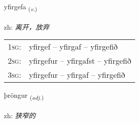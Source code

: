 \documentclass[frontgrid, backgrid]{flacards}\usepackage[]{graphicx}\usepackage[]{color}
\begin{document}
\renewcommand{\flhead}{\vskip5pt \fboxsep=0pt {\small\bfseries\footnotesize Sagnorð | 动词}}
\renewcommand{\fcfoot}{\vskip5pt \fboxsep=0pt \hspace{2pt}{\small\bfseries\footnotesize 2K}}

\renewcommand{\blhead}{\vskip5pt {\small\bfseries\footnotesize Sagnorð | 动词 }}
\renewcommand{\bcfoot}{\vskip5pt \hspace{2pt}{\small\bfseries\footnotesize 2K}}


{yfirgefa \small{\textsubscript{(\textit{v.})}} \\[1ex] %
\textphonetic{[ɪːvɪrcɛva]} \\
zh: \emph{离开，放弃} \\  [2ex]
\renewcommand*{\arraystretch}{0.8}
\begin{tabular}{p{1cm}l}
\textsc{1sg}: & yfirgef -- yfirgaf -- yfirgefið \\ 
\textsc{2sg}: & yfirgefur -- yfirgafst -- yfirgefið \\ 
\textsc{3sg}: & yfirgefur -- yfirgaf -- yfirgefið \\ 
\end{tabular}
}

\renewcommand{\flhead}{\vskip5pt \fboxsep=0pt {\small\bfseries\footnotesize Lýsingarorð | 形容词}}
\renewcommand{\fcfoot}{\vskip5pt \fboxsep=0pt \hspace{2pt}{\small\bfseries\footnotesize 2K}}

\renewcommand{\blhead}{\vskip5pt {\small\bfseries\footnotesize Lýsingarorð | 形容词 }}
\renewcommand{\bcfoot}{\vskip5pt \hspace{2pt}{\small\bfseries\footnotesize 2K}}


{þröngur \small{\textsubscript{(\textit{adj.})}} \\[1ex] %
\textphonetic{[θrœiŋkʏr]} \\
zh: \emph{狭窄的} \\  [2ex]
\renewcommand*{\arraystretch}{0.8}
}
\end{document}
